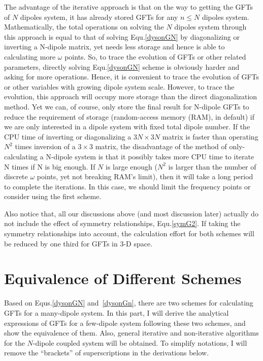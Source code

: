 The advantage of the iterative approach is that on the way to getting the GFTs of $N$ dipoles system, it has already stored GFTs for any $n\leq N$ dipoles system. Mathematically, the total operations on solving the $N$ dipoles system through this approach is equal to that of solving Equ.\eqref{dysonGN} by diagonalizing or inverting a N-dipole matrix, yet needs less storage and hence is able to calculating more $\omega$ points. So, to trace the evolution of GFTs or other related parameters, directly solving Equ.\eqref{dysonGN} scheme is obviously harder and asking for more operations. Hence, it is convenient to trace the evolution of GFTs or other variables with growing dipole system scale. However, to trace the evolution, this approach will occupy more storage than the direct diagonalization method. Yet we can, of course, only store the final result for N-dipole GFTs to reduce the requirement of storage (random-access memory (RAM), in default) if we are only interested in a dipole system with fixed total dipole number. If the CPU time of inverting or diagonalizing a $3N\times3N$ matrix is faster than operating $N^2$ times inversion of a $3\times 3$ matrix, the disadvantage of the method of only-calculating a N-dipole system is that it possibly takes more CPU time to iterate N times if N is big enough. If $N$ is large enough ($N^2$ is larger than the number of discrete $\omega$ points, yet not breaking RAM's limit), then it will take a long period to complete the iterations. In this case, we should limit the frequency points or consider using the first scheme.

Also notice that, all our discussions above (and most discussion later) actually do not include the effect of symmetry relationships, Equ.\eqref{symG2}. If taking the symmetry relationships into account, the calculation effort for both schemes will be reduced by one third for GFTs in 3-D space.



\section{Equivalence of Different Schemes}
Based on Equs.\eqref{dysonGN} and~\eqref{dysonGn}, there are two schemes for calculating GFTs for a many-dipole system. In this part, I will derive the analytical expressions of GFTs for a few-dipole system following these two schemes, and show the equivalence of them. Also, general iterative and non-iterative algorithms for the $N$-dipole coupled system will be obtained. To simplify notations, I will remove the ``brackets'' of superscriptions in the derivations below.

